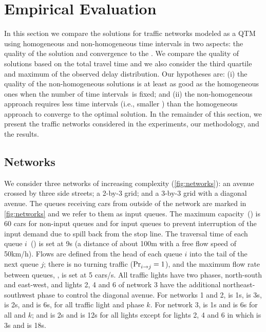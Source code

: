 \section{Empirical Evaluation}
  
In this section we compare the solutions for traffic networks modeled as a QTM
using homogeneous and non-homogeneous time intervals in two aspects:
%
the quality of the solution and convergence to the .
%
We compare the quality of solutions based on the total travel time and we also
consider the third quartile and maximum of the observed delay distribution.
%
%
%
Our hypotheses are:
%
(i) the quality of the non-homogeneous solutions is at least as good as the
homogeneous ones when the number of time intervals~\Nn is fixed; and 
%
(ii) the non-homogeneous approach requires less time intervals (i.e., smaller
\Nn) than the homogeneous approach to converge to the optimal solution.
%
In the remainder of this section, we present the traffic networks considered in
the experiments, our methodology, and the results.



\subsection{Networks}

We consider three networks of increasing complexity (\cref{fig:networks}): an
avenue crossed by three side streets; a 2-by-3 grid; and a 3-by-3 grid with a
diagonal avenue.
%
The queues receiving cars from outside of the network are marked in
\cref{fig:networks} and we refer to them as input queues.
%
The maximum capacity~() is 60 cars for non-input queues and
 for input queues to prevent interruption of the input
demand due to spill back from the stop line. 
%
The traversal time of each queue $i$~() is set at 9s (a distance of
about 100m with a free flow speed of 50km/h).
%
Flows are defined from the head of each queue $i$ into the tail of the next
queue $j$;
%
there is no turning traffic ($\mathrm{Pr}_{i\to j}^{\mathrm{}}=1$), and the maximum flow rate
between queues, , is set at 5 cars/s.
%
All traffic lights have two phases, north-south and east-west, and lights 2, 4
and 6 of network 3 have the additional northeast-southwest phase to control the
diagonal avenue.
%
For networks 1 and 2,  is 1s,  is 3s, \CTMIN{\tl} is
2s, and \CTMAX{\tl} is 6s, for all traffic light \tl and phase $k$.
%
For network 3,  is 1s and  is 6s for all \tl and
$k$; and \CTMIN{\tl} is 2s and \CTMAX{\tl} is 12s for all lights \tl except for
lights 2, 4 and 6 in which \CTMIN{\tl} is 3s and \CTMAX{\tl} is 18s.




